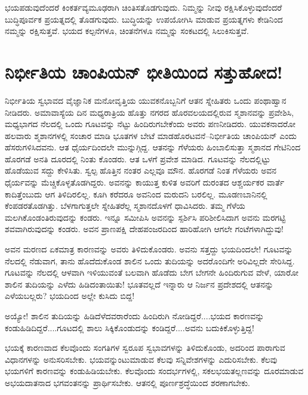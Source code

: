 ಭಯಪಡುವುದೆಂದರೆ ಕಿಂಕರ್ತವ್ಯಮೂಢರಾಗಿ ಚಿಂತಿಸತೊಡಗುವುದು. ನಿಮ್ಮನ್ನು ನೀವು ರಕ್ಷಿಸಿಕೊಳ್ಳುವುದೆಂದರೆ ಬುದ್ಧಿಪೂರ್ವಕ ಪ್ರಯತ್ನದಲ್ಲಿ ತೊಡಗುವುದು. ಬುದ್ಧಿಯನ್ನು ಉಪ\-ಯೋಗಿಸಿ ಮಾಡುವ ಪ್ರಯತ್ನಗಳು ಕೇಡಿನಿಂದ ನಮ್ಮನ್ನು ರಕ್ಷಿಸುತ್ತವೆ. ಭಯದ ಕಲ್ಪನೆಗಳೂ, ಚಿಂತನೆಗಳೂ ನಮ್ಮನ್ನು ಸಂಕಟದಲ್ಲಿ ಸಿಲುಕಿಸುತ್ತವೆ.


\section*{ನಿರ್ಭೀತಿಯ ಚಾಂಪಿಯನ್ ಭೀತಿಯಿಂದ ಸತ್ತುಹೋದ!}


ನಿರ್ಭೀತಿಯ ಸ್ವಭಾವದ ವೈಜ್ಞಾನಿಕ ಮನೋವೃತ್ತಿಯ ಯುವಕನೊಬ್ಬನಿಗೆ ಆತನ ಸ್ನೇಹಿತರು ಒಂದು ಪಂಥಾಹ್ವಾನ ನೀಡಿದರು. ಅಮಾವಾಸ್ಯೆಯ ದಿನ ಮಧ್ಯರಾತ್ರಿಯ ಹೊತ್ತು ನಗರದ ಹೊರವಲಯದಲ್ಲಿರುವ ಸ್ಮಶಾನವನ್ನು ಪ್ರವೇಶಿಸಿ, ಮಧ್ಯಭಾಗದ ನೆಲದಲ್ಲಿ ಒಂದು ಗೂಟವನ್ನು ನೆಟ್ಟು ಹಿಂದಿರುಗಬೇಕೆಂದು ಅವರು ಪಣನೀಡಿದರು. ಯುವಕನಾದರೋ ಹಲವಾರು ಶ್ಮಶಾನಗಳಲ್ಲಿ ಸಂಚಾರ ಮಾಡಿ ಭೂತಗಳ ಬೇಟೆ ಮಾಡಹೊರಟವನೆ–ನಿರ್ಭೀತಿಯ ಚಾಂಪಿಯನ್ ಎಂದು ಹೆಸರುಗಳಿಸಿದವನು. ಆತ ಧೈರ್ಯದಿಂದಲೇ ಮುನ್ನುಗ್ಗಿದ್ದ. ಆತನನ್ನು ಗೆಳೆಯರು ಹಿಂಬಾಲಿಸುತ್ತಾ ಸ್ಮಶಾನದ ಗೇಟಿನಿಂದ ಹೊರಗಡೆ ಅನತಿ ದೂರದಲ್ಲಿ ನಿಂತು ಕೊಂಡರು. ಆತ ಒಳಗೆ ಪ್ರವೇಶ ಮಾಡಿದ. ಗೂಟವನ್ನು ನೆಲದಲ್ಲಿಟ್ಟು ಹೊಡೆಯುವ ಸದ್ದು ಕೇಳಿಸಿತು. ಸ್ವಲ್ಪ ಹೊತ್ತಿನ ನಂತರ ಎಲ್ಲವೂ ಮೌನ. ಹೊರಗಡೆ ನಿಂತ ಗೆಳೆಯರು ಅವನ ಧೈರ್ಯವನ್ನು ಮೆಚ್ಚಿಕೊಳ್ಳತೊಡಗಿದ್ದರು. ಅವನನ್ನು ಕಾಯುತ್ತ ಕುಳಿತ ಅವರಿಗೆ ದುರಂತದ ಆಶ್ಚರ್ಯಕರ ವಾರ್ತೆ ಕಾದಿತ್ತೆಂಬುದು ಆಗ ತಿಳಿದಿರಲಿಲ್ಲ. ಕೂಗಿ ಕರೆದರೂ ಅವನಿಂದ ಮರುದನಿ ಬರಲಿಲ್ಲ. ಮೂಡಣಬಾನಿನಲ್ಲಿ ಕೆಂಪಡರ\-ತೊಡಗಿತ್ತು. ಬೆಳಗಾಗುತ್ತಲೇ ಸ್ನೇಹಿತರೆಲ್ಲ ಸ್ಮಶಾನದೊಳಗೆ ಧಾವಿಸಿದರು. ತಮ್ಮ ಗೆಳೆಯ ಮಲಗಿಕೊಂಡಂತಿರುವುದನ್ನು ಕಂಡರು. ಇನ್ನೂ ಸಮೀಪಿಸಿ ಅವನನ್ನು ಸ್ಪರ್ಶಿಸಿ ಪರಿಶೀಲಿಸಿದಾಗ ಅವನು ಮರಗಟ್ಟಿ ಶವವಾಗಿರುವುದನ್ನು ಕಂಡರು. ಅವನ ಪ್ರಾಣಪಕ್ಷಿ ದೇಹಪಂಜರದಿಂದ ಹಾರಿಹೋಗಿ ಆಗಲೇ ಗಂಟೆಗಳಾಗಿದ್ದುವು!

ಅವನ ಮರಣದ ಏಕಮಾತ್ರ ಕಾರಣವನ್ನು ಅವರು ತಿಳಿದುಕೊಂಡರು. ಅವನು ಸತ್ತದ್ದು ಭಯದಿಂದಲೇ! ಗೂಟವನ್ನು ನೆಲದಲ್ಲಿ ನೆಡುವಾಗ, ತಾನು ಹೊದೆದುಕೊಂಡ ಶಾಲಿನ ಒಂದು ತುದಿಯನ್ನು ಅದರೊಂದಿಗೇ ಅರಿವಿಲ್ಲದೇ ಸೇರಿಸಿದ್ದ. ಗೂಟವನ್ನು ನೆಲದಲ್ಲಿ ಆಳವಾಗಿ ಇಳಿಯುವಂತೆ ಬಲವಾಗಿ ಹೊಡೆದು ಬೇಗ ಬೇಗನೇ ಹಿಂದಿರುಗುವ ವೇಳೆ, ಯಾರೋ ಶಾಲಿನ ತುದಿಯನ್ನು ಎಳೆದು ಹಿಡಿದಂತಾಯಿತು! ಭೂತವಲ್ಲದೆ ಇನ್ನಾರು ಆ ನಿರ್ಜನ ಪ್ರದೇಶದಲ್ಲಿ ಆತನನ್ನು ಎಳೆಯಬಲ್ಲರು? ಭಯದಿಂದ ಅಲ್ಲೇ ಕುಸಿದು ಬಿದ್ದ!

\newpage

ಅಯ್ಯೋ! ಶಾಲಿನ ತುದಿಯನ್ನು ಹಿಡಿದೆಳೆದವರಾರೆಂದು ಹಿಂದಿರುಗಿ ನೋಡಿದ್ದರೆ....ಭಯದ ಕಾರಣವನ್ನು ಕಂಡುಹಿಡಿದಿದ್ದರೆ....ಗೂಟದಲ್ಲಿ ಶಾಲು ಸಿಕ್ಕಿಕೊಂಡುದನ್ನು ಕಂಡಿದ್ದರೆ....ಅವನು ಬದುಕಿಕೊಳ್ಳುತ್ತಿದ್ದ!

ಭಯಕ್ಕೆ ಕಾರಣವಾದ ಕೆಲವೊಂದು ಸಂಗತಿಗಳ ಸ್ವರೂಪ ಸ್ವಭಾವಗಳನ್ನು ತಿಳಿದುಕೊಂಡು, ಅದರಿಂದ ಪಾರಾಗುವ ವಿಧಾನಗಳನ್ನು ಅನುಸರಿಸಬೇಕು. ಭಯವನ್ನುಂಟುಮಾಡುವ ಕೆಲವು ಸನ್ನಿವೇಶಗಳನ್ನು ಎದುರಿಸಬೇಕು. ಕೆಲವು ಭಯಗಳಿಗೆ ಕಾರಣವನ್ನು ಕಂಡುಹಿಡಿಯಬೇಕು. ಕೆಲವೊಂದು ಸಂದರ್ಭಗಳಲ್ಲಿ, ಸಕಲಭಯತಲ್ಲಣವನ್ನು ದೂರಮಾಡುವ ಅಭಯದಾತನಾದ ಭಗವಂತನನ್ನು ಪ್ರಾರ್ಥಿಸಬೇಕು. ಆತನಲ್ಲಿ ಪೂರ್ಣಶ್ರದ್ಧೆಯಿಂದ ಶರಣಾಗಬೇಕು.


